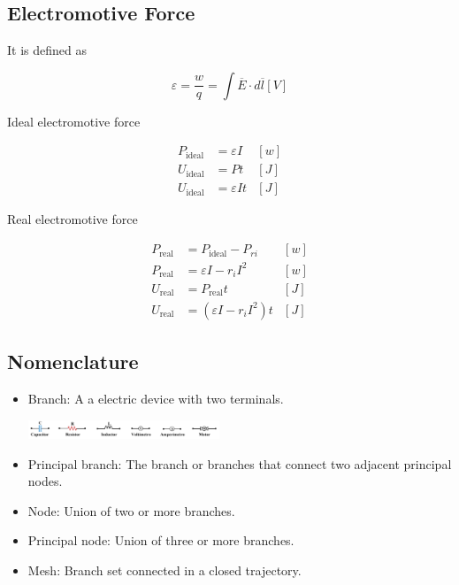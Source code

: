 \documentclass[letterpaper]{article}
\newcommand{\divline}{\noindent\makebox[\linewidth]{\rule{\textwidth}{0.4pt}}}
\begin{document}
    \begin{multicols}{2}
        \section{Electromotive Force}

        It is defined as

        \[\varepsilon = \frac{w}{q} = \int \overline{E} \cdot d \overline{l} [V]\]

        Ideal electromotive force

        \begin{align*}
            P_{\text{ideal}} & = \varepsilon I & [w] \\
            U_{\text{ideal}} & = P t & [J] \\
            U_{\text{ideal}} & = \varepsilon I t & [J]
        \end{align*}

        Real electromotive force

        \begin{align*}
            P_{\text{real}} & = P_{\text{ideal}} - P_{ri} & [w] \\
            P_{\text{real}} & = \varepsilon I - r_{i} I^{2} & [w] \\
            U_{\text{real}} & = P_{\text{real}} t & [J] \\
            U_{\text{real}} & = ( \varepsilon I - r_{i} I^{2} ) t & [J]
        \end{align*}
    \end{multicols}
    \divline

    \begin{multicols}{2}
        \section{Nomenclature}

        \begin{itemize}
            \item Branch: A a electric device with two terminals.
            \begin{center}
                \includegraphics[width=0.45\textwidth]{ElectricidadyMagnetismo/img/nomenclature.png}
            \end{center}
            \item Principal branch: The branch or branches that connect two adjacent principal nodes.
            \item Node: Union of two or more branches.
            \item Principal node: Union of three or more branches.
            \item Mesh: Branch set connected in a closed trajectory.
        \end{itemize}
    \end{multicols}
    \divline
\end{document}
